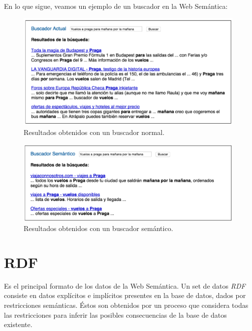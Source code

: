 \documentclass[10pt,a4paper]{article}
\begin{document}
En lo que sigue, veamos un ejemplo de un buscador en la Web Semántica:

\begin{figure}[H] %
\begin{center}
\includegraphics[width=400pt]{imgs/resultadoNormal}
\caption{Resultados obtenidos con un buscador normal.}
\end{center}
\end{figure}
\begin{figure}[H] %
\begin{center}
\includegraphics[width=400pt]{imgs/resultadoSemantico}
\caption{Resultados obtenidos con un buscador semántico.}
\end{center}
\end{figure}

\section{RDF}
Es el principal formato de los datos de la Web Semántica. Un set de datos \textit{RDF} consiste en datos explícitos e implícitos presentes en la base de datos, dados por restricciones semánticas. Éstos son obtenidos por un proceso que considera todas las restricciones para inferir las posibles consecuencias de la base de datos existente.
\end{document}
